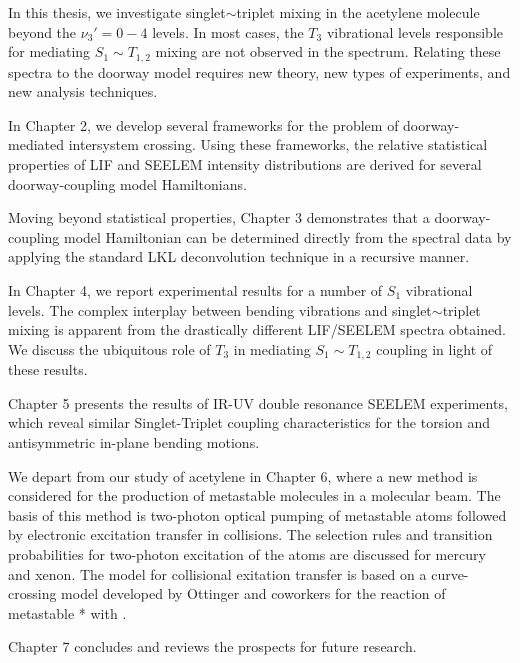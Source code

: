 \documentclass[12pt]{mitthesis}
\begin{document}
In this thesis, we investigate singlet$\sim$triplet mixing in the
acetylene molecule beyond the $\nu_3'=0-4$ levels.  In most cases, the
$T_3$ vibrational levels responsible for mediating $S_1 \sim T_{1,2}$
mixing are not observed in the spectrum.  Relating these spectra to
the doorway model requires new theory, new types of experiments, and
new analysis techniques.

In Chapter 2, we develop several frameworks for the problem of
doorway-mediated intersystem crossing.  Using these frameworks, the
relative statistical properties of LIF and SEELEM intensity
distributions are derived for several doorway-coupling model
Hamiltonians.

Moving beyond statistical properties, Chapter 3 demonstrates that a
doorway-coupling model Hamiltonian can be determined directly from the
spectral data by applying the standard LKL deconvolution technique in
a recursive manner.


In Chapter 4, we report experimental results for a number of $S_1$
vibrational levels.  The complex interplay between bending vibrations
and singlet$\sim$triplet mixing is apparent from the drastically
different LIF/SEELEM spectra obtained.  We discuss the ubiquitous role
of $T_3$ in mediating $S_1 \sim T_{1,2}$ coupling in light of these
results.

Chapter 5 presents the results of IR-UV double resonance SEELEM
experiments, which reveal similar Singlet-Triplet coupling
characteristics for the torsion and antisymmetric in-plane bending
motions.

We depart from our study of acetylene in Chapter 6, where a new method
is considered for the production of metastable molecules in a
molecular beam.  The basis of this method is two-photon optical
pumping of metastable atoms followed by electronic excitation transfer
in collisions.  The selection rules and transition probabilities for
two-photon excitation of the atoms are discussed for mercury and
xenon.  The model for collisional exitation transfer is based on a
curve-crossing model developed by Ottinger and coworkers for the
reaction of metastable * with .  

Chapter 7 concludes and reviews the prospects for future research.



\end{document}
